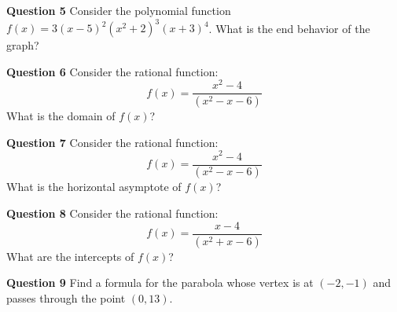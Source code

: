 \documentclass{beamer}
\begin{document}
%
%	
%	

\begin{frame}{\textbf{Question 5}}
	Consider the polynomial function $f(x)=3(x-5)^2(x^2+2)^3(x+3)^4$. What is the end behavior of the graph?
	
	\bigskip
	
%	
\end{frame}

\begin{frame}{\textbf{Question 6}}
	Consider the rational function: \[f(x)=\frac{x^2-4}{(x^2-x-6)}\]	 What is the domain of $f(x)$? 
	 \bigskip
%	 
\end{frame}

%	

\begin{frame}{\textbf{Question 7}}
	Consider the rational function: \[f(x)=\frac{x^2-4}{(x^2-x-6)}\] What is the horizontal asymptote of $f(x)$?
	\bigskip	
%	
\end{frame}

\begin{frame}{\textbf{Question 8}}
	Consider the rational function: \[f(x)=\frac{x-4}{(x^2+x-6)}\] What are the intercepts of $f(x)$?
	
	\bigskip
	
%	
\end{frame}

\begin{frame}{\textbf{Question 9}}
	Find a formula for the parabola whose vertex is at $(-2,-1)$ and passes through the point $(0,13)$.\\
	\bigskip
	
\end{frame}
\end{document}
